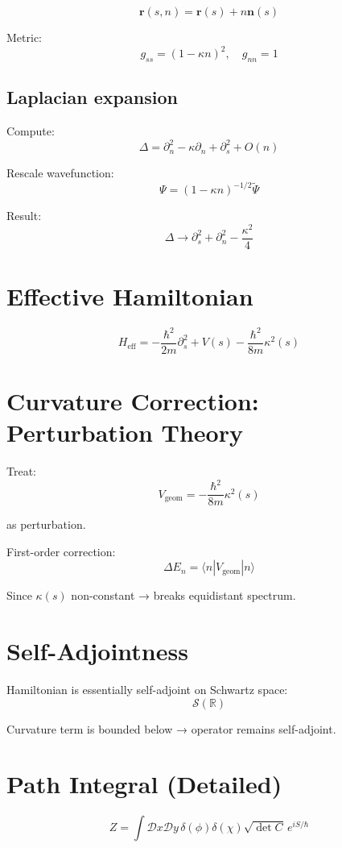 \documentclass[11pt]{article}
\begin{document}
\[
\mathbf{r}(s,n)=\mathbf{r}(s)+n\mathbf{n}(s)
\]

Metric:
\[
g_{ss}=(1-\kappa n)^2,\quad g_{nn}=1
\]

\subsection{Laplacian expansion}

Compute:
\[
\Delta = \partial_n^2 - \kappa \partial_n + \partial_s^2 + O(n)
\]

Rescale wavefunction:
\[
\Psi = (1-\kappa n)^{-1/2}\tilde{\Psi}
\]

Result:
\[
\Delta \to \partial_s^2 + \partial_n^2 - \frac{\kappa^2}{4}
\]

\section{Effective Hamiltonian}

\[
H_{\mathrm{eff}} =
-\frac{\hbar^2}{2m}\partial_s^2
+ V(s)
-\frac{\hbar^2}{8m}\kappa^2(s)
\]

\section{Curvature Correction: Perturbation Theory}

Treat:
\[
V_{\mathrm{geom}} = -\frac{\hbar^2}{8m}\kappa^2(s)
\]

as perturbation.

First-order correction:
\[
\Delta E_n = \langle n | V_{\mathrm{geom}} | n \rangle
\]

Since $\kappa(s)$ non-constant → breaks equidistant spectrum.

\section{Self-Adjointness}

Hamiltonian is essentially self-adjoint on Schwartz space:
\[
\mathcal{S}(\mathbb{R})
\]

Curvature term is bounded below → operator remains self-adjoint.

\section{Path Integral (Detailed)}

\[
Z = \int \mathcal{D}x \mathcal{D}y \, \delta(\phi)\delta(\chi)\sqrt{\det C}\,e^{iS/\hbar}
\]
\end{document}
